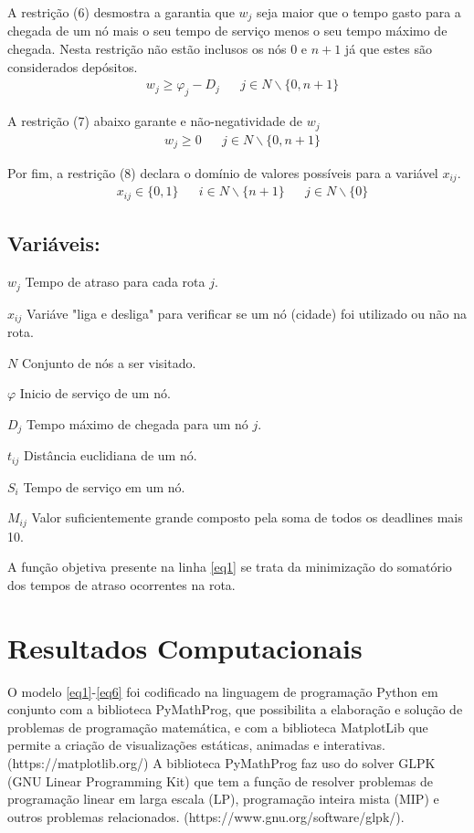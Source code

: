 \documentclass[12pt]{article}
\begin{document}
A restrição (6) desmostra a garantia que $w_j$ seja maior que o tempo gasto para a chegada de um nó mais o seu tempo de serviço menos o seu tempo máximo de chegada. Nesta restrição não estão inclusos os nós $0$ e $n+1$ já que estes são considerados depósitos.
\begin{align}
   & w_j \geq \varphi_j - D_j & \label{eq4} & j\in N\backslash \{0,n+1\}
\end{align}

A restrição (7) abaixo garante e não-negatividade de $w_j$
\begin{align}
   & w_j \geq 0 & \label{eq5} & j\in N\backslash \{0,n+1\}
\end{align}

Por fim, a restrição (8) declara o domínio de valores possíveis para a variável $x_{ij}$.
\begin{align}
   & x_{ij} \in \{0,1\} & \label{eq6} & i\in N\backslash \{n+1\} &  & j\in N\backslash \{0\}
\end{align}


\subsection{Variáveis:}

$w_j$ Tempo de atraso para cada rota $j$.

$x_{ij}$ Variáve "liga e desliga" para verificar se um nó (cidade) foi utilizado ou não na rota.

$N$ Conjunto de nós a ser visitado.

$\varphi$ Inicio de serviço de um nó.

$D_j$ Tempo máximo de chegada para um nó $j$.

$t_{ij}$ Distância euclidiana de um nó.

$S_i$ Tempo de serviço em um nó.

$M_{ij}$ Valor suficientemente grande composto pela soma de todos os deadlines mais 10.

A função objetiva presente na linha \eqref{eq1} se trata da minimização do somatório dos tempos de atraso ocorrentes na rota.

\section{Resultados Computacionais}
O modelo \eqref{eq1}-\eqref{eq6} foi codificado na linguagem de programação Python em conjunto com a biblioteca PyMathProg, que possibilita a elaboração e solução de problemas de programação matemática, e com a biblioteca MatplotLib que permite a criação de visualizações estáticas, animadas e interativas.(https://matplotlib.org/)
A biblioteca PyMathProg faz uso do solver GLPK (GNU Linear Programming Kit) que tem a função de resolver problemas de programação linear em larga escala (LP), programação inteira mista (MIP) e outros problemas relacionados. (https://www.gnu.org/software/glpk/).
\end{document}

